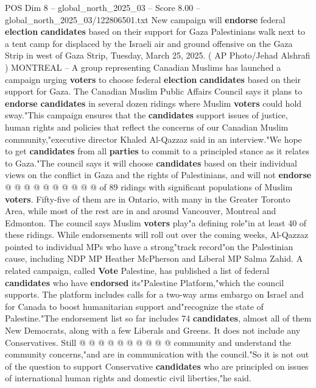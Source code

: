 \begin{textsample}{POS Dim 8 – global\_north\_2025\_03 – Score 8.00 – global\_north\_2025\_03/122806501.txt}  \label{ex:f8_pos_331}
New campaign will \textbf{endorse} federal \textbf{election} \textbf{candidates} based on their support for Gaza Palestinians walk next to a tent camp for displaced by the Israeli air and ground offensive on the Gaza Strip in west of Gaza Strip, Tuesday, March 25, 2025. ( AP Photo/Jehad Alshrafi ) MONTREAL -- A group representing Canadian Muslims has launched a campaign urging \textbf{voters} to choose federal \textbf{election} \textbf{candidates} based on their support for Gaza.
The Canadian Muslim Public Affairs Council says it plans to \textbf{endorse} \textbf{candidates} in several dozen ridings where Muslim \textbf{voters} could hold sway."This campaign ensures that the \textbf{candidates} support issues of justice, human rights and policies that reflect the concerns of our Canadian Muslim community,"executive director Khaled Al-Qazzaz said in an interview."We hope to get \textbf{candidates} from all \textbf{parties} to commit to a principled stance as it relates to Gaza."The council says it will choose \textbf{candidates} based on their individual views on the conflict in Gaza and the rights of Palestinians, and will not \textbf{endorse} @ @ @ @ @ @ @ @ @ @ of 89 ridings with significant populations of Muslim \textbf{voters}.
Fifty-five of them are in Ontario, with many in the Greater Toronto Area, while most of the rest are in and around Vancouver, Montreal and Edmonton.
The council says Muslim \textbf{voters} play"a defining role"in at least 40 of these ridings.
While endorsements will roll out over the coming weeks, Al-Qazzaz pointed to individual MPs who have a strong"track record"on the Palestinian cause, including NDP MP Heather McPherson and Liberal MP Salma Zahid.
A related campaign, called \textbf{Vote} Palestine, has published a list of federal \textbf{candidates} who have \textbf{endorsed} its"Palestine Platform,"which the council supports.
The platform includes calls for a two-way arms embargo on Israel and for Canada to boost humanitarian support and"recognize the state of Palestine."The endorsement list so far includes 74 \textbf{candidates}, almost all of them New Democrats, along with a few Liberals and Greens.
It does not include any Conservatives.
Still @ @ @ @ @ @ @ @ @ @ community and understand the community concerns,"and are in communication with the council."So it is not out of the question to support Conservative \textbf{candidates} who are principled on issues of international human rights and domestic civil liberties,"he said.

\end{textsample}
